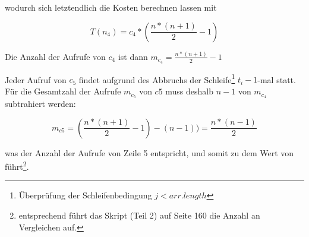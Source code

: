 \noindent
wodurch sich letztendlich die Kosten berechnen lassen mit

\begin{equation}
    T(n_4) = c_4 * (\frac{n * (n + 1)}{2} - 1)
\end{equation}

\noindent
Die Anzahl der Aufrufe von $c_4$ ist dann $m_{c_4} = \frac{n * (n + 1)}{2} - 1$


\noindent
Jeder Aufruf von $c_5$ findet aufgrund des Abbruchs der Schleife\footnote{
    Überprüfung der Schleifenbedingung $j < arr.length$
} $t_i - 1$-mal statt.\\
Für die Gesamtzahl der Aufrufe $m_{c_5}$ von $c5$ muss deshalb $n-1$ von $m_{c_4}$ subtrahiert werden:

\begin{equation}
    m_{c5} = (\frac{n * (n + 1)}{2} - 1) - (n-1)) = \frac{n * (n - 1)}{2}
\end{equation}

\noindent
was der Anzahl der Aufrufe von Zeile 5 entspricht, und somit zu dem Wert von  führt\footnote{
    entsprechend führt das Skript (Teil 2) auf Seite 160 die Anzahl an Vergleichen auf.
}.